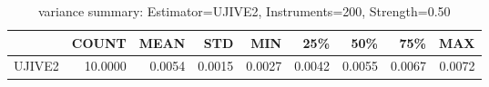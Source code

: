 \begin{table}[ht]
\centering
\caption{variance summary: Estimator=UJIVE2, Instruments=200, Strength=0.50}
\begin{tabular}{lrrrrrrrr}
\toprule
 & COUNT & MEAN & STD & MIN & 25\% & 50\% & 75\% & MAX \\
\midrule
UJIVE2 & 10.0000 & 0.0054 & 0.0015 & 0.0027 & 0.0042 & 0.0055 & 0.0067 & 0.0072 \\
\bottomrule
\end{tabular}
\end{table}
